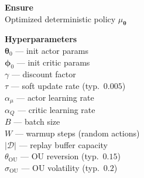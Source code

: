 \documentclass[11pt]{article}
\begin{document}
\begin{algorithm}[p]\small
\caption{DDPG --- Deep Deterministic Policy Gradient}\label{alg:ddpg-scalar}
\vspace{2pt}
\noindent
\begin{minipage}[t]{0.28\linewidth}
\renewcommand{\arraystretch}{1.12}
\textbf{Ensure} \\[2pt]
Optimized deterministic policy $\mu_{\boldsymbol{\theta}}$

\vspace{6pt}
\textbf{Hyperparameters} \\[2pt]
$\boldsymbol{\theta}_0$ --- init actor params \\
$\boldsymbol{\phi}_0$ --- init critic params \\
$\gamma$ --- discount factor \\
$\tau$ --- soft update rate (typ.\ $0.005$) \\
$\alpha_\mu$ --- actor learning rate \\
$\alpha_Q$ --- critic learning rate \\
$B$ --- batch size \\
$W$ --- warmup steps (random actions) \\
$|\mathcal{D}|$ --- replay buffer capacity \\
$\theta_{\text{OU}}$ --- OU reversion (typ.\ $0.15$) \\
$\sigma_{\text{OU}}$ --- OU volatility (typ.\ $0.2$)


\end{minipage}
\end{algorithm}
\end{document}
